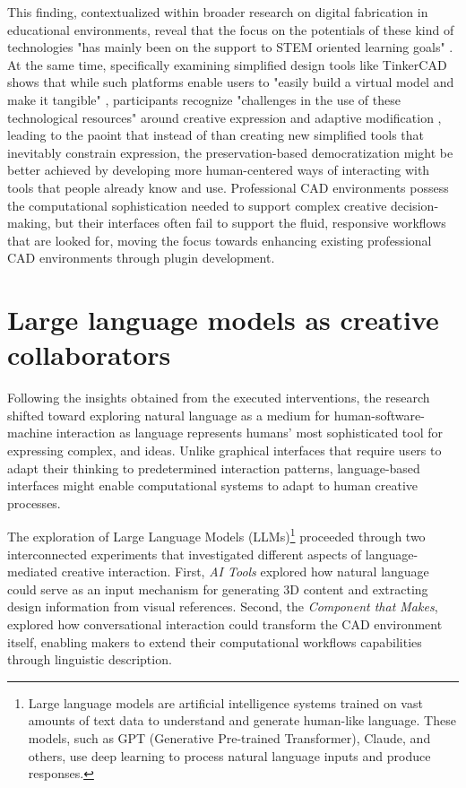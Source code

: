 \vspace{0.5cm}

This finding, contextualized within broader research on digital fabrication in educational environments, reveal that the focus on the potentials of these kind of technologies "has mainly been on the support to STEM oriented learning goals" \citep{smith2016}. At the same time, specifically examining simplified design tools like TinkerCAD shows that while such platforms enable users to "easily build a virtual model and make it tangible" \citep{barbosa2024}, participants recognize "challenges in the use of these technological resources" around creative expression and adaptive modification \citep{barbosa2024}, leading to the paoint that instead of than creating new simplified tools that inevitably constrain expression, the preservation-based democratization might be better achieved by developing more human-centered ways of interacting with tools that people already know and use. Professional CAD environments possess the computational sophistication needed to support complex creative decision-making, but their interfaces often fail to support the fluid, responsive workflows that are looked for, moving the focus towards enhancing existing professional CAD environments through plugin development.

\section{Large language models as creative collaborators}

Following the insights obtained from the executed interventions, the research shifted toward exploring natural language as a medium for human-software-machine interaction as language represents humans' most sophisticated tool for expressing complex, and ideas. Unlike graphical interfaces that require users to adapt their thinking to predetermined interaction patterns, language-based interfaces might enable computational systems to adapt to human creative processes. 

\vspace{0.5cm}

The exploration of Large Language Models (LLMs)\footnote{Large language models are artificial intelligence systems trained on vast amounts of text data to understand and generate human-like language. These models, such as GPT (Generative Pre-trained Transformer), Claude, and others, use deep learning to process natural language inputs and produce responses.} proceeded through two interconnected experiments that investigated different aspects of language-mediated creative interaction. First, \textit{AI Tools} explored how natural language could serve as an input mechanism for generating 3D content and extracting design information from visual references. Second, the \textit{Component that Makes}, explored how conversational interaction could transform the CAD environment itself, enabling makers to extend their computational workflows capabilities through linguistic description.

